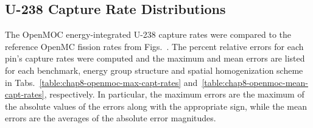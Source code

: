 \subsection{U-238 Capture Rate Distributions}
\label{subsec:chap8-capt-rates}

The OpenMOC energy-integrated U-238 capture rates were compared to the reference OpenMC fission rates from Figs.~. The percent relative errors for each pin's capture rates were computed and the maximum and mean errors are listed for each benchmark, energy group structure and spatial homogenization scheme in Tabs.~\ref{table:chap8-openmoc-max-capt-rates} and~\ref{table:chap8-openmoc-mean-capt-rates}, respectively. In particular, the maximum errors are the maximum of the absolute values of the errors along with the appropriate sign, while the mean errors are the averages of the absolute error magnitudes.

